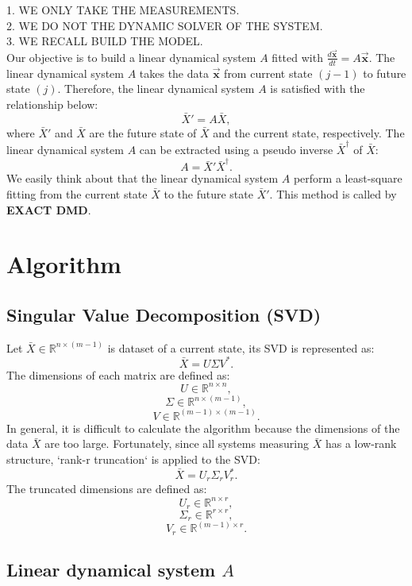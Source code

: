 \documentclass[onecolumn]{IEEEtran}
\begin{document}
1. WE ONLY TAKE THE MEASUREMENTS.\\

2. WE DO NOT THE DYNAMIC SOLVER OF THE SYSTEM.\\

3. WE RECALL BUILD THE MODEL.\\

Our objective is to build a linear dynamical system $A$ fitted with $\frac{d\vec{\mathbf{x}}}{dt} = A \vec{\mathbf{x}}$.
The linear dynamical system $A$ takes the data $\vec{\mathbf{x}}$ from current state $(j-1)$ to future state $(j)$.
Therefore, the linear dynamical system $A$ is satisfied with the relationship below:
$$\bar{X}' = A \bar{X},$$
where $\bar{X}'$ and $\bar{X}$ are the future state of $\bar{X}$ and the current state, respectively.
The linear dynamical system $A$ can be extracted using a pseudo inverse $\bar{X}^{\dagger}$ of $\bar{X}$:
$$A = \bar{X}' \bar{X}^{\dagger}.$$
We easily think about that the linear dynamical system $A$ perform a least-square fitting from the current state $\bar{X}$ to the future state $\bar{X}'$.
This method is called by \textbf{EXACT DMD}.

\section{Algorithm}
\label{algorithm}

\subsection{Singular Value Decomposition (SVD)}

Let $\bar{X} \in \mathbb{R}^{n \times (m-1)}$ is dataset of a current state, its SVD is represented as:
$$
\bar{X} = U \Sigma V^*.
$$
The dimensions of each matrix are defined as:
$$U \in \mathbb{R}^{n \times n},$$
$$\Sigma \in \mathbb{R}^{n \times (m-1)},$$
$$V \in \mathbb{R}^{(m-1) \times (m-1)}.$$
In general, it is difficult to calculate the algorithm because the dimensions of the data $\bar{X}$ are too large. Fortunately, since all systems measuring $\bar{X}$ has a low-rank structure, `rank-r truncation` is applied to the SVD:
$$
\bar{X} = U_r \Sigma_r V^*_r.
$$
The truncated dimensions are defined as:
$$U_r \in \mathbb{R}^{n \times r},$$
$$\Sigma_r \in \mathbb{R}^{r \times r},$$
$$V_r \in \mathbb{R}^{(m-1) \times r}.$$

\subsection{Linear dynamical system $A$}
\end{document}

